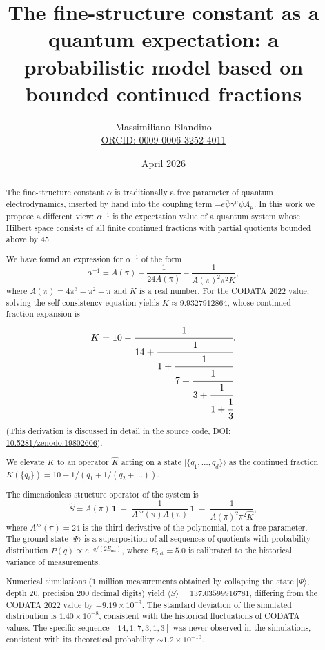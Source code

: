\documentclass[12pt]{article}
\title{The fine-structure constant as a quantum expectation: a probabilistic model based on bounded continued fractions}
\author{Massimiliano Blandino \\ 
\href{https://orcid.org/0009-0006-3252-4011}{ORCID: 0009-0006-3252-4011}}
\date{April 2026}
\begin{document}
\maketitle

\begin{abstract}
The fine-structure constant $\alpha$ is traditionally a free parameter of quantum electrodynamics, inserted by hand into the coupling term $-e\bar\psi\gamma^\mu\psi A_\mu$. In this work we propose a different view: $\alpha^{-1}$ is the expectation value of a quantum system whose Hilbert space consists of all finite continued fractions with partial quotients bounded above by 45.

We have found an expression for $\alpha^{-1}$ of the form
\[
\alpha^{-1} = A(\pi) - \frac{1}{24A(\pi)} - \frac{1}{A(\pi)^2 \pi^2 K},
\]
where $A(\pi)=4\pi^3+\pi^2+\pi$ and $K$ is a real number. For the CODATA 2022 value, solving the self-consistency equation yields $K \approx 9.9327912864$, whose continued fraction expansion is
\[
K = 10 - \cfrac{1}{14 + \cfrac{1}{1 + \cfrac{1}{7 + \cfrac{1}{3 + \cfrac{1}{1 + \cfrac{1}{3}}}}}}.
\]
(This derivation is discussed in detail in the source code, DOI: \href{https://doi.org/10.5281/zenodo.19802606}{10.5281/zenodo.19802606}).

We elevate $K$ to an operator $\hat K$ acting on a state $|\{q_1,\dots,q_d\}\rangle$ as the continued fraction $K(\{q_i\}) = 10 - 1/(q_1+1/(q_2+\dots))$.

The dimensionless structure operator of the system is
\[
\hat S = A(\pi)\,\mathbf{1} \;-\; \frac{1}{A'''(\pi)A(\pi)}\,\mathbf{1} \;-\; \frac{1}{A(\pi)^2 \pi^2 \hat K},
\]
where $A'''(\pi)=24$ is the third derivative of the polynomial, not a free parameter. The ground state $|\Psi\rangle$ is a superposition of all sequences of quotients with probability distribution $P(q)\propto e^{-q/(2E_{\text{int}})}$, where $E_{\text{int}}=5.0$ is calibrated to the historical variance of measurements.

Numerical simulations (1 million measurements obtained by collapsing the state $|\Psi\rangle$, depth 20, precision 200 decimal digits) yield $\langle \hat S \rangle = 137.03599916781$, differing from the CODATA 2022 value by $-9.19\times10^{-9}$. The standard deviation of the simulated distribution is $1.40\times10^{-8}$, consistent with the historical fluctuations of CODATA values. The specific sequence $[14,1,7,3,1,3]$ was never observed in the simulations, consistent with its theoretical probability $\sim 1.2\times10^{-10}$.


\end{abstract}
\end{document}
